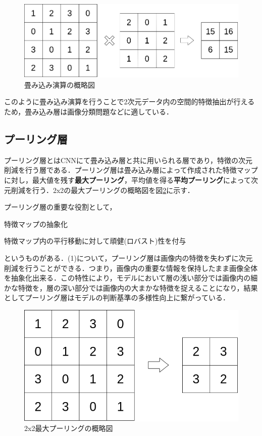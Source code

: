 \documentclass[a4j, 11pt]{jreport}
\begin{document}
\begin{figure}[htbp]
 \centering
 \includegraphics[width=0.9\hsize, keepaspectratio]{images/drawio/conv2d.png}
 \caption{畳み込み演算の概略図}
 \label{fig:conv2d}
\end{figure}

このように畳み込み演算を行うことで2次元データ内の空間的特徴抽出が行えるため，畳み込み層は画像分類問題などに適している．

\subsection{プーリング層}
プーリング層とはCNNにて畳み込み層と共に用いられる層であり，特徴の次元削減を行う層である．プーリング層は畳み込み層によって作成された特徴マップに対し，最大値を残す\textbf{最大プーリング}，平均値を得る\textbf{平均プーリング}によって次元削減を行う．2x2の最大プーリングの概略図を図\ref{fig:maxpooling}に示す．

プーリング層の重要な役割として，
\begin{inparaenum}[(1)]
 \item 特徴マップの抽象化
 \item 特徴マップ内の平行移動に対して頑健(ロバスト)性を付与
\end{inparaenum}
というものがある．(1)について，プーリング層は画像内の特徴を失わずに次元削減を行うことができる．つまり，画像内の重要な情報を保持したまま画像全体を抽象化出来る．この特性により，モデルにおいて層の浅い部分では画像内の細かな特徴を，層の深い部分では画像内の大まかな特徴を捉えることになり，結果としてプーリング層はモデルの判断基準の多様性向上に繋がっている．

\begin{figure}[htbp]
 \centering
 \includegraphics[width=0.8\hsize, keepaspectratio]{images/drawio/maxpooling.png}
 \caption{2x2最大プーリングの概略図}
 \label{fig:maxpooling}
\end{figure}
\end{document}
